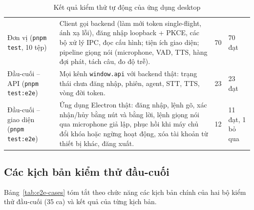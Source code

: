 \begin{table}[!htbp]
\caption{Kết quả kiểm thử tự động của ứng dụng desktop}\label{tab:desktop-tests}
\bang
\begin{tabularx}{\textwidth}{|L{3.2cm}|Y|C{1.5cm}|C{2.6cm}|}\hline
{} &  &  & \\\hline
Đơn vị (\texttt{pnpm test}, 10 tệp) & Client gọi backend (làm mới token single-flight, ánh xạ lỗi), đăng nhập loopback + PKCE, các bộ xử lý IPC, đọc cấu hình; tiện ích giao diện; pipeline giọng nói (microphone, VAD, TTS, hàng đợi phát, tách câu, đo độ trễ). & 70 & 70 đạt\\\hline
Đầu-cuối – API (\texttt{pnpm test:e2e}) & Mọi kênh \texttt{window.api} với backend thật: trạng thái chưa đăng nhập, phiên, agent, STT, TTS, vòng đời token. & 23 & 23 đạt\\\hline
Đầu-cuối – giao diện (\texttt{pnpm test:e2e}) & Ứng dụng Electron thật: đăng nhập, lệnh gõ, xác nhận/hủy bằng nút và bằng lời, lệnh giọng nói qua microphone giả lập, phục hồi khi máy chủ đổi khóa hoặc ngừng hoạt động, xóa tài khoản từ thiết bị khác, đăng xuất. & 12 & 11 đạt, 1 bỏ qua\\\hline
\end{tabularx}
\end{table}

\subsection{Các kịch bản kiểm thử đầu-cuối}
Bảng~\ref{tab:e2e-cases} tóm tắt theo chức năng các kịch bản chính của hai bộ kiểm thử đầu-cuối (35 ca) và kết quả của từng kịch bản.

